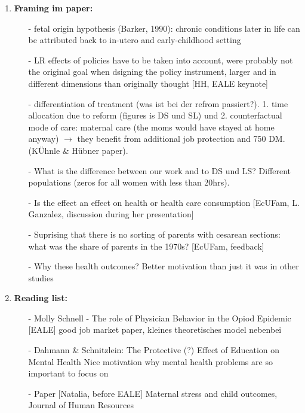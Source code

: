 \documentclass[11pt,a4paper]{article}
\begin{document}
{\begin{enumerate}
\item \textbf{Framing im paper:} \vspace{-1em}
\begin{itemize}
\item[-] fetal origin hypothesis (Barker, 1990): chronic conditions later in life can be attributed back to in-utero and early-childhood setting
\item[-] LR effects of policies have to be taken into account, were probably not the original goal when dsigning the policy instrument, larger and in different dimensions than originally thought [HH, EALE keynote]
\item[-] differentiation of treatment (was ist bei der refrom passiert?). 1. time allocation due to reform (figures is DS und SL) und 2. counterfactual mode of care: maternal care (the moms would have stayed at home anyway) $\rightarrow$ they benefit from additional job protection and 750 DM.
(KÜhnle \& Hübner paper).
\item[-] What is the difference between our work and to DS und LS? Different populations (zeros for all women with less than 20hrs).
\item[-] Is the effect an effect on health or health care consumption [EcUFam, L. Ganzalez, discussion during her presentation]
\item[-] Suprising that there is no sorting of parents with cesarean sections: what was the share of parents in the 1970s? [EcUFam, feedback]
\item[-] Why these health outcomes? Better motivation than just it was in other studies
\end{itemize}

\item \textbf{Reading list:}
\begin{itemize}
\item[-] Molly Schnell - The role of Physician Behavior in the Opiod Epidemic [EALE]\newline
good job market paper, kleines theoretisches model nebenbei
\item[-]  Dahmann \& Schnitzlein: The Protective (?) Effect of Education on Mental Health   \newline
 Nice motivation why mental health problems are so important to focus on 
 \item[-] Paper [Natalia, before EALE] Maternal stress and child outcomes, Journal of Human Resources

\end{itemize}


\end{enumerate}}
\end{document}

